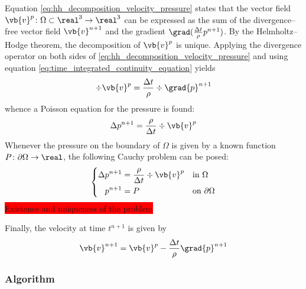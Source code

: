 Equation \eqref{eq:hh_decomposition_velocity_pressure} states that the vector field $\vb{v}^p \colon \Omega \subset \real^3 \to \real^3$ can be expressed as the sum of the divergence--free vector field $\vb{v}^{n+1}$ and the gradient $\grad(\frac{\Delta t}{\rho} p^{n+1})$. By the Helmholtz--Hodge theorem, the decomposition of $\vb{v}^p$ is unique. Applying the divergence operator on both sides of \eqref{eq:hh_decomposition_velocity_pressure} and using equation \eqref{eq:time_integrated_continuity_equation} yields
\begin{equation*}
    \div{\vb{v}^p} = \frac{\Delta t}{\rho} \div{\grad{p}^{n+1}}
\end{equation*}
whence a Poisson equation for the pressure is found:
\begin{equation*}
    \Delta p^{n+1} = \frac{\rho}{\Delta t} \div{\vb{v}^p}
\end{equation*}
Whenever the pressure on the boundary of $\Omega$ is given by a known function $P \colon \partial \Omega \to \real$, the following Cauchy problem can be posed:
\begin{equation}
    \left\{
        \begin{aligned}
            \Delta p^{n+1}  &= \frac{\rho}{\Delta t} \div{\vb{v}^p} & &\text{in } \Omega            \\
            p^{n+1}         &= P                                    & &\text{on } \partial \Omega
        \end{aligned}
    \right.
\end{equation}
\colorbox{red}{Existence and uniqueness of the problem}

Finally, the velocity at time $t^{n+1}$ is given by
\begin{equation} \label{eq:velocity_time_n+1_fsm_first_approach}
    \vb{v}^{n+1} = \vb{v}^p - \frac{\Delta t}{\rho} \grad{p}^{n+1}
\end{equation}

\subsubsection*{Algorithm}


